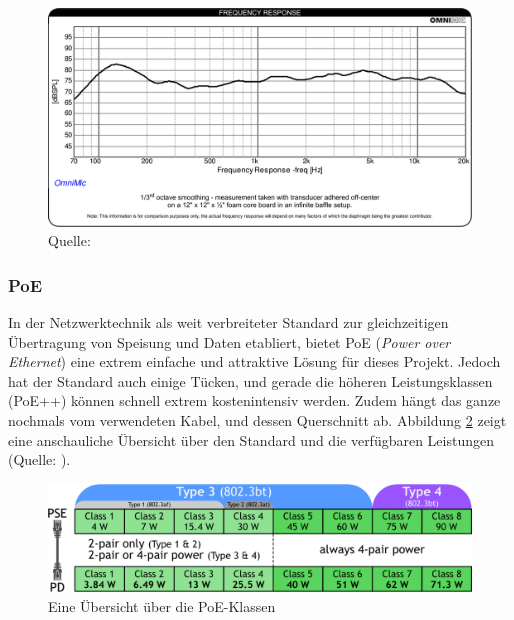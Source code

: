 \begin{figure}[H]
	\centering
	\includegraphics[width=\textwidth*7/8]{pictures/DAEX19QLP4_freqresp.png}
	\caption{Quelle: \cite{DAEX19QLP4spec}}
	\label{pics:DAEX19QLP4_freqresp}
\end{figure}
\subsubsection{PoE}
In der Netzwerktechnik als weit verbreiteter Standard zur gleichzeitigen Übertragung von Speisung und Daten etabliert, bietet PoE (\textit{Power over Ethernet}) eine extrem einfache und attraktive Lösung für dieses Projekt. Jedoch hat der Standard auch einige Tücken, und gerade die höheren Leistungsklassen (PoE++) können schnell extrem kostenintensiv werden. Zudem hängt das ganze nochmals vom verwendeten Kabel, und dessen Querschnitt ab. Abbildung \ref{pic:poe_overview} zeigt eine anschauliche Übersicht über den Standard und die verfügbaren Leistungen (Quelle: \cite{PoE_overview_doc}).
\begin{figure}[H]
	\centering
	\includegraphics[width=\textwidth*3/4]{pictures/PoE_overview.png}
	\caption{Eine Übersicht über die PoE-Klassen}
	\label{pic:poe_overview}
\end{figure}
